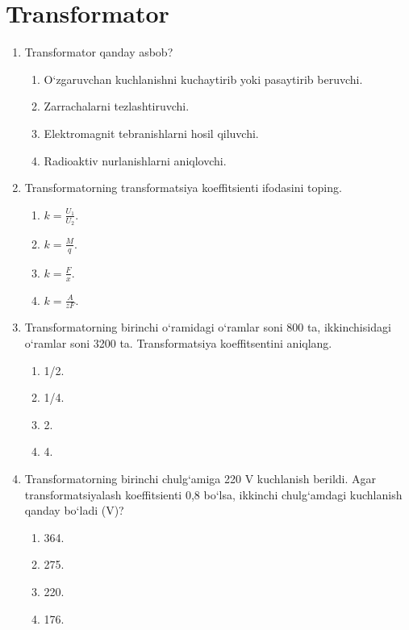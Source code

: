 \section{Transformator}


\begin{enumerate}

\item Transformator qanday asbob?
\begin{enumerate}[label=\Alph*)]
\item O‘zgaruvchan kuchlanishni kuchaytirib yoki pasaytirib beruvchi.
\item Zarrachalarni tezlashtiruvchi.
\item Elektromagnit tebranishlarni hosil qiluvchi.
\item Radioaktiv nurlanishlarni aniqlovchi.
\end{enumerate}


\item Transformatorning transformatsiya koeffitsienti ifodasini toping.
\begin{enumerate}[label=\Alph*)]
\item $k = \frac{U_1}{U_2}$.
\item $k = \frac{M}{q}$.
\item $k = \frac{F}{x}$.
\item $k = \frac{A}{zF}$.
\end{enumerate}

\item Transformatorning birinchi o‘ramidagi o‘ramlar soni 800 ta, ikkinchisidagi o‘ramlar soni 3200 ta. Transformatsiya koeffitsentini aniqlang.
\begin{enumerate}[label=\Alph*)]
\item 1/2.
\item 1/4.
\item 2.
\item 4.
\end{enumerate}

\item Transformatorning birinchi chulg‘amiga 220 V kuchlanish berildi. Agar transformatsiyalash koeffitsienti 0,8 bo‘lsa, ikkinchi chulg‘amdagi kuchlanish qanday bo‘ladi (V)?
\begin{enumerate}[label=\Alph*)]
\item 364.
\item 275.
\item 220.
\item 176.
\end{enumerate}


\end{enumerate}
